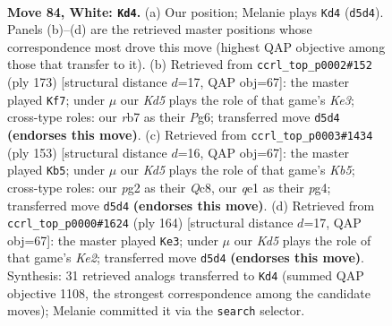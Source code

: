 \documentclass[11pt]{article}
\begin{document}
\clearpage

\begin{figure}[p]\centering
\begin{subfigure}{0.46\textwidth}\centering
\resizebox{\linewidth}{!}{%
\newchessgame
\chessboard[
  setfen={8/1r6/6k1/1q1K4/8/8/6p1/4q3 w - - 2 84},
  showmover=false,
  pgfstyle=straightmove, color=movearrow, markmove={d5-d4}
]}
\caption{}
\end{subfigure}\hfill
\begin{subfigure}{0.46\textwidth}\centering
\resizebox{\linewidth}{!}{%
\newchessgame
\chessboard[
  setfen={8/8/K1Q1k1p1/8/8/1P6/8/4q3 b - - 9 87},
  showmover=false,
  pgfstyle=straightmove, color=movearrow, markmove={e6-f7}
]}
\caption{}
\end{subfigure}
\\[4pt]
\begin{subfigure}{0.46\textwidth}\centering
\resizebox{\linewidth}{!}{%
\newchessgame
\chessboard[
  setfen={2q5/8/6K1/8/1k1Q2P1/8/8/8 b - - 0 77},
  showmover=false,
  pgfstyle=straightmove, color=movearrow, markmove={b4-b5}
]}
\caption{}
\end{subfigure}\hfill
\begin{subfigure}{0.46\textwidth}\centering
\resizebox{\linewidth}{!}{%
\newchessgame
\chessboard[
  setfen={1Q6/8/8/8/8/7k/4K1q1/8 w - - 13 83},
  showmover=false,
  pgfstyle=straightmove, color=movearrow, markmove={e2-e3}
]}
\caption{}
\end{subfigure}
\caption{\textbf{Move 84, White: \texttt{Kd4}.} (a) Our position; Melanie plays \texttt{Kd4} (\texttt{d5d4}). Panels (b)--(d) are the retrieved master positions whose correspondence most drove this move (highest QAP objective among those that transfer to it). (b) Retrieved from \texttt{ccrl\_top\_p0002\#152} (ply 173) [structural distance $d$=17, QAP obj=67]: the master played \texttt{Kf7}; under $\mu$ our \emph{Kd5} plays the role of that game's \emph{Ke3}; cross-type roles: our \emph{r}b7 as their \emph{P}g6; transferred move \texttt{d5d4} \textbf{(endorses this move)}. (c) Retrieved from \texttt{ccrl\_top\_p0003\#1434} (ply 153) [structural distance $d$=16, QAP obj=67]: the master played \texttt{Kb5}; under $\mu$ our \emph{Kd5} plays the role of that game's \emph{Kb5}; cross-type roles: our \emph{p}g2 as their \emph{Q}c8, our \emph{q}e1 as their \emph{p}g4; transferred move \texttt{d5d4} \textbf{(endorses this move)}. (d) Retrieved from \texttt{ccrl\_top\_p0000\#1624} (ply 164) [structural distance $d$=17, QAP obj=67]: the master played \texttt{Ke3}; under $\mu$ our \emph{Kd5} plays the role of that game's \emph{Ke2}; transferred move \texttt{d5d4} \textbf{(endorses this move)}. Synthesis: 31 retrieved analogs transferred to \texttt{Kd4} (summed QAP objective 1108, the strongest correspondence among the candidate moves); Melanie committed it via the \texttt{search} selector.}
\label{fig:thought-m166}
\end{figure}
\end{document}
